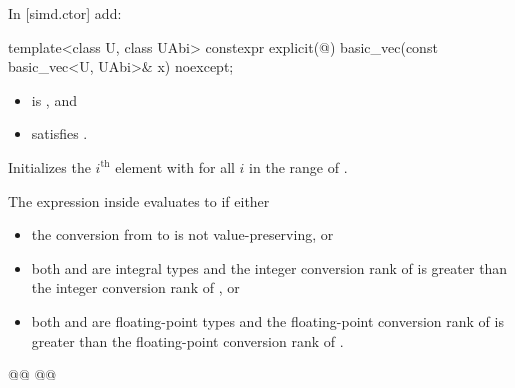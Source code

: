 In [simd.ctor] add:
\begin{wgText}\setcounter{Paras}{4}
\begin{itemdecl}
template<class U, class UAbi>
  constexpr explicit(@\seebelow@) basic_vec(const basic_vec<U, UAbi>& x) noexcept;
\end{itemdecl}

\begin{itemdescr}
\pnum
\constraints
\begin{itemize}
\item {} is , and
\item {} satisfies .
\end{itemize}

\pnum
\effects
Initializes the $i^\text{th}$ element with  for
all $i$ in the range of .

\pnum
\remarks
The expression inside  evaluates to  if either
\begin{itemize}
 \item
   the conversion from  to  is not value-preserving,
   or
 \item
   both  and  are integral types and the integer
   conversion rank of  is greater than the integer
   conversion rank of , or
 \item
   both  and  are floating-point types and the
   floating-point conversion rank of  is greater than
   the floating-point conversion rank of .
\end{itemize}
\end{itemdescr}

\begin{itemdecl}
@@
  @@
\end{itemdecl}

\begin{itemdescr}
\pnumAdd\wgAdd{%
\constraints}
\begin{itemize}
\wgItemAdd[\tcode{\exposid{simd-size-v}<U, UAbi> == size()} is \tcode{false}, or]
\end{itemize}

\pnumAdd{}
\end{itemdescr}
\end{wgText}

